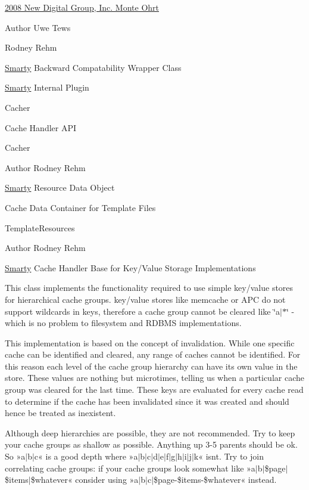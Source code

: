 \hyperlink{}{2008 New Digital Group, Inc.  Monte Ohrt } \begin{DoxyAuthor}{Author}
Uwe Tews 

Rodney Rehm
\end{DoxyAuthor}
\hyperlink{class_smarty}{Smarty} Backward Compatability Wrapper Class

\hyperlink{class_smarty}{Smarty} Internal Plugin

Cacher

Cache Handler A\+P\+I

Cacher \begin{DoxyAuthor}{Author}
Rodney Rehm
\end{DoxyAuthor}
\hyperlink{class_smarty}{Smarty} Resource Data Object

Cache Data Container for Template Files

Template\+Resources \begin{DoxyAuthor}{Author}
Rodney Rehm
\end{DoxyAuthor}
\hyperlink{class_smarty}{Smarty} Cache Handler Base for Key/\+Value Storage Implementations

This class implements the functionality required to use simple key/value stores for hierarchical cache groups. key/value stores like memcache or A\+P\+C do not support wildcards in keys, therefore a cache group cannot be cleared like \char`\"{}a$\vert$$\ast$\char`\"{} -\/ which is no problem to filesystem and R\+D\+B\+M\+S implementations.

This implementation is based on the concept of invalidation. While one specific cache can be identified and cleared, any range of caches cannot be identified. For this reason each level of the cache group hierarchy can have its own value in the store. These values are nothing but microtimes, telling us when a particular cache group was cleared for the last time. These keys are evaluated for every cache read to determine if the cache has been invalidated since it was created and should hence be treated as inexistent.

Although deep hierarchies are possible, they are not recommended. Try to keep your cache groups as shallow as possible. Anything up 3-\/5 parents should be ok. So »a$\vert$b$\vert$c« is a good depth where »a$\vert$b$\vert$c$\vert$d$\vert$e$\vert$f$\vert$g$\vert$h$\vert$i$\vert$j$\vert$k« isn\textquotesingle{}t. Try to join correlating cache groups\+: if your cache groups look somewhat like »a$\vert$b$\vert$\$page$\vert$\$items$\vert$\$whatever« consider using »a$\vert$b$\vert$c$\vert$\$page-\/\$items-\/\$whatever« instead.

